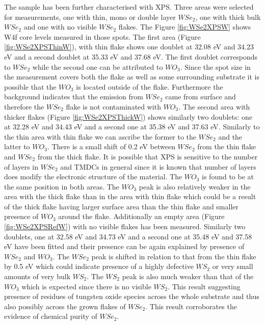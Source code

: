 The sample has been further characterised with XPS. Three areas were selected for measurements, one with thin, mono or double layer $WSe_2$, one with thick bulk $WSe_2$ and one with no visible $WSe_2$ flakes. The Figure \ref{fig:WSe2XPSW} shows W4f core levels measured in those spots. The first area (Figure \ref{fig:WSe2XPSThinW}), with thin flake shows one doublet at 32.08 eV and 34.23 eV and a second doublet at 35.33 eV and 37.68 eV. The first doublet corresponds to $WSe_2$ while the second one can be attributed to $WO_3$. Since the spot size in the measurement covers both the flake as well as some surrounding substrate it is possible that the $WO_3$ is located outside of the flake. Furthermore the background indicates that the emission from $WSe_2$ came from surface and therefore the $WSe_2$ flake is not contaminated with $WO_3$. 
The second area with thicker flakes (Figure \ref{fig:WSe2XPSThickW}) shows similarly two doublets: one at 32.28 eV and 34.43 eV and a second one at 35.38 eV and 37.63 eV. Similarly to the thin area with thin flake we can ascribe the former to the $WSe_2$ and the latter to $WO_3$. There is a small shift of 0.2 eV between $WSe_2$ from the thin flake and $WSe_2$ from the thick flake. It is possible that XPS is sensitive to the number of layers in $WSe_2$ and TMDCs in general since it is known that number of layers does modify the electronic structure of the material. The $WO_3$ is found to be at the same position in both areas. The $WO_3$ peak is also relatively weaker in the area with the thick flake than in the area with thin flake which could be a result of the thick flake having larger surface area than the thin flake and smaller presence of $WO_3$ around the flake. 
Additionally an empty area (Figure \ref{fig:WSe2XPSRefW}) with no visible flakes has been measured. Similarly two doublets, one at 32.58 eV and 34.73 eV and a second one at 35.48 eV and 37.58 eV have been fitted and their presence can be again explained by presence of $WSe_2$ and $WO_3$. The $WSe_2$ peak is shifted in relation to that from the thin flake by 0.5 eV which could indicate presence of a highly defective $WS_2$ or very small amounts of very bulk $WS_2$. The $WS_2$ peak is also much weaker than that of the $WO_3$ which is expected since there is no visible $WS_2$. This result suggesting presence of residues of tungsten oxide species across the whole substrate and thus also possibly across the grown flakes of $WSe_2$. This result corroborates the evidence of chemical purity of $WSe_2$.

